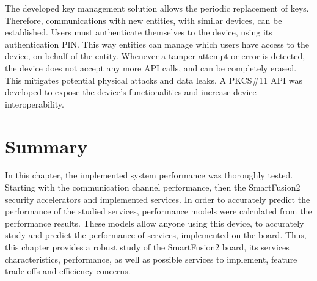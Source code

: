 The developed key management solution allows the periodic replacement of keys. Therefore, communications with new entities, with similar devices, can be established.
Users must authenticate themselves to the device, using its authentication PIN. This way entities can manage which users have access to the device, on behalf of the entity.
Whenever a tamper attempt or error is detected, the device does not accept any more API calls, and can be completely erased. This mitigates potential physical attacks and data leaks.
A PKCS\#11 API was developed to expose the device's functionalities and increase device interoperability.

\section*{Summary}\label{chap:evaluation:summary}

In this chapter, the implemented system performance was thoroughly tested. Starting with the communication channel performance, then the SmartFusion2 security accelerators and implemented services. In order to accurately predict the performance of the studied services, performance models were calculated from the performance results. These models allow anyone using this device, to accurately study and predict the performance of services, implemented on the board. Thus, this chapter provides a robust study of the SmartFusion2 board, its services characteristics, performance, as well as possible services to implement, feature trade offs and efficiency concerns.
